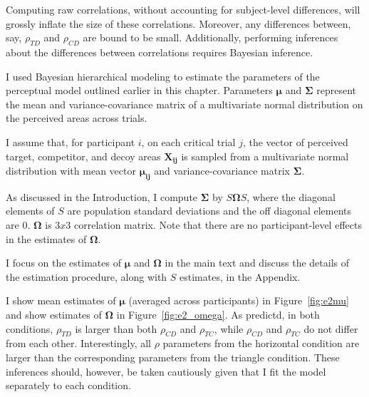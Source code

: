 Computing raw correlations, without accounting for subject-level differences, will grossly inflate the size of these correlations. Moreover, any differences between, say, $\rho_{TD}$ and $\rho_{CD}$ are bound to be small. Additionally, performing inferences about the differences between correlations requires Bayesian inference. 

I used Bayesian hierarchical modeling to estimate the parameters of the perceptual model outlined earlier in this chapter. Parameters $\boldsymbol{\mu}$ and $\boldsymbol{\Sigma}$ represent the mean and variance-covariance matrix of a multivariate normal distribution on the perceived areas across trials. 

I assume that, for participant $i$, on each critical trial $j$, the vector of perceived target, competitor, and decoy areas $\mathbf{X_{ij}}$ is sampled from a multivariate normal distribution with mean vector $\boldsymbol{\mu_{ij}}$ and variance-covariance matrix $\boldsymbol{\Sigma}$. 

As discussed in the Introduction, I compute $\boldsymbol{\Sigma}$ by $S\boldsymbol{\Omega}S$, where the diagonal elements of $S$ are population standard deviations and the off diagonal elements are $0$. $\boldsymbol{\Omega}$ is $3 x 3$ correlation matrix. Note that there are no participant-level effects in the estimates of $\boldsymbol{\Omega}$.

I focus on the estimates of $\boldsymbol{\mu}$ and $\boldsymbol{\Omega}$ in the main text and discuss the details of the estimation procedure, along with $S$ estimates, in the Appendix. 

I show mean estimates of $\boldsymbol{\mu}$ (averaged across participants) in Figure~\ref{fig:e2mu} and show estimates of $\boldsymbol{\Omega}$ in Figure~\ref{fig:e2_omega}. As predictd, in both conditions, $\rho_{TD}$ is larger than both $\rho_{CD}$ and $\rho_{TC}$, while $\rho_{CD}$ and $\rho_{TC}$ do not differ from each other. Interestingly, all $\rho$ parameters from the horizontal condition are larger than the corresponding parameters from the triangle condition. These inferences should, however, be taken cautiously given that I fit the model separately to each condition.

